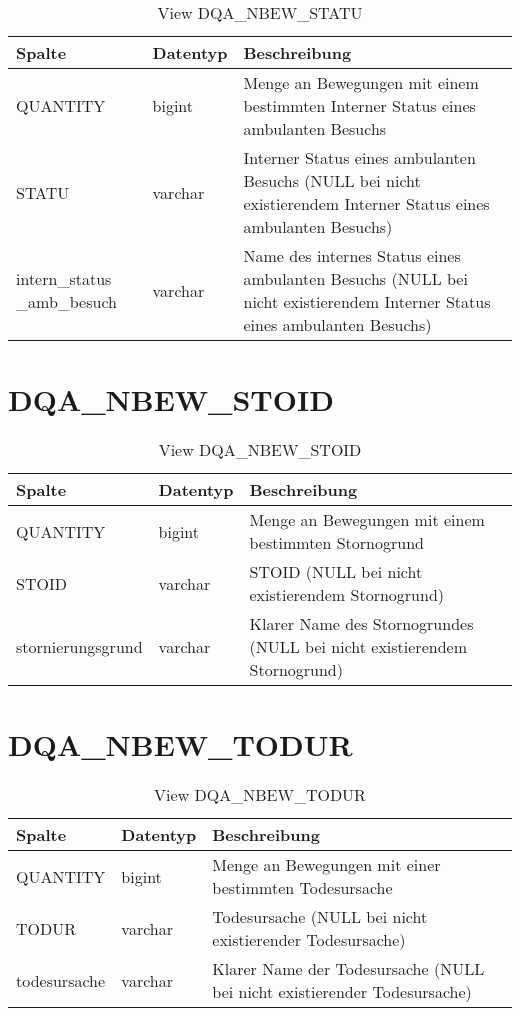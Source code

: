   \begin{table}[ht]
    \centering
    \caption{View DQA\_NBEW\_STATU}
    \label{tab:dqanbewstatu}
    \begin{tabular}{||p{3cm}|l|p{10cm}||}
      \hline
      Spalte & Datentyp & Beschreibung \\ [0.5ex] \hline \hline
QUANTITY & bigint & Menge an Bewegungen mit einem bestimmten Interner Status eines ambulanten Besuchs \\ \hline
STATU & varchar & Interner Status eines ambulanten Besuchs (NULL bei nicht existierendem Interner Status eines ambulanten Besuchs)\\ \hline
intern\_status \_amb\_besuch & varchar & Name des internes Status eines ambulanten Besuchs (NULL bei nicht existierendem Interner Status eines ambulanten Besuchs)\\ \hline
    \end{tabular}
  \end{table}
 \clearpage
  \section{DQA\_NBEW\_STOID}

  \begin{table}[ht]
    \centering
    \caption{View DQA\_NBEW\_STOID}
    \label{tab:dqanbewstoid}
    \begin{tabular}{||l|l|p{10cm}||}
      \hline
      Spalte & Datentyp & Beschreibung \\ [0.5ex] \hline \hline
QUANTITY & bigint & Menge an Bewegungen mit einem bestimmten Stornogrund \\ \hline
STOID & varchar & STOID (NULL bei nicht existierendem Stornogrund)\\ \hline
stornierungsgrund & varchar & Klarer Name des Stornogrundes (NULL bei nicht existierendem Stornogrund)\\ \hline
    \end{tabular}
  \end{table}

  \section{DQA\_NBEW\_TODUR}

  \begin{table}[ht]
    \centering
    \caption{View DQA\_NBEW\_TODUR}
    \label{tab:dqanbewtodur}
    \begin{tabular}{||l|l|p{10cm}||}
      \hline
      Spalte & Datentyp & Beschreibung \\ [0.5ex] \hline \hline
QUANTITY & bigint & Menge an Bewegungen mit einer bestimmten Todesursache \\ \hline
TODUR & varchar & Todesursache (NULL bei nicht existierender Todesursache)\\ \hline
todesursache & varchar & Klarer Name der Todesursache (NULL bei nicht existierender Todesursache)\\ \hline
    \end{tabular}
  \end{table}
 \clearpage

